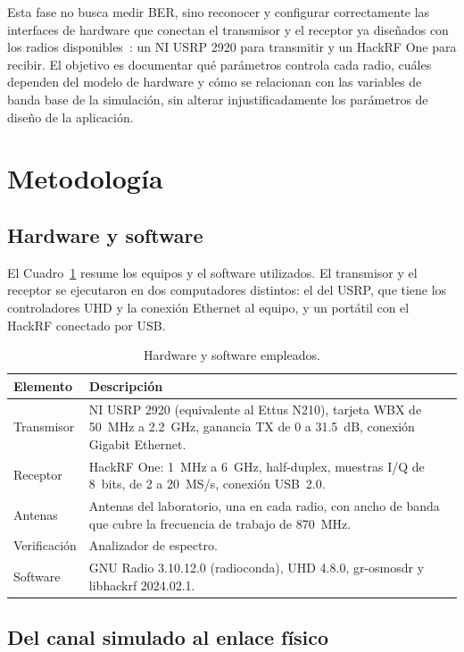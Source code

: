 \documentclass[conference]{IEEEtran}
\begin{document}
Esta fase no busca medir BER, sino reconocer y configurar correctamente las interfaces de hardware que conectan el transmisor y el receptor ya diseñados con los radios disponibles~\cite{guia3}: un NI USRP 2920 para transmitir y un HackRF One para recibir. El objetivo es documentar qué parámetros controla cada radio, cuáles dependen del modelo de hardware y cómo se relacionan con las variables de banda base de la simulación, sin alterar injustificadamente los parámetros de diseño de la aplicación.

\section{Metodología}

\subsection{Hardware y software}

El Cuadro~\ref{tab:hw} resume los equipos y el software utilizados. El transmisor y el receptor se ejecutaron en dos computadores distintos: el del USRP, que tiene los controladores UHD y la conexión Ethernet al equipo, y un portátil con el HackRF conectado por USB.

\begin{table}[!t]
\centering
\caption{Hardware y software empleados.}
\label{tab:hw}
\begin{tabular}{>{\raggedright}p{2.1cm}p{5.6cm}}
\toprule
Elemento & Descripción \\
\midrule
Transmisor & NI USRP 2920 (equivalente al Ettus N210), tarjeta WBX de 50~MHz a 2.2~GHz, ganancia TX de 0 a 31.5~dB, conexión Gigabit Ethernet. \\
Receptor & HackRF One: 1~MHz a 6~GHz, half-duplex, muestras I/Q de 8~bits, de 2 a 20~MS/s, conexión USB~2.0. \\
Antenas & Antenas del laboratorio, una en cada radio, con ancho de banda que cubre la frecuencia de trabajo de 870~MHz. \\
Verificación & Analizador de espectro. \\
Software & GNU Radio 3.10.12.0 (radioconda), UHD 4.8.0, gr-osmosdr y libhackrf 2024.02.1. \\
\bottomrule
\end{tabular}
\end{table}

\subsection{Del canal simulado al enlace físico}
\end{document}
